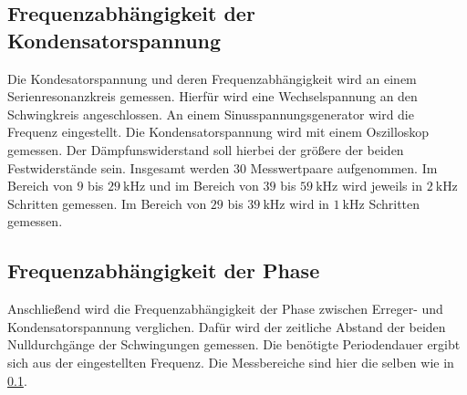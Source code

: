 \subsection{Frequenzabhängigkeit der Kondensatorspannung}
\label{sec:c}
Die Kondesatorspannung und deren Frequenzabhängigkeit wird an einem Serienresonanzkreis gemessen. Hierfür wird eine 
Wechselspannung an den Schwingkreis angeschlossen. An einem Sinusspannungsgenerator wird die Frequenz eingestellt.
Die Kondensatorspannung wird mit einem Oszilloskop gemessen. Der Dämpfunswiderstand soll hierbei der 
größere der beiden Festwiderstände sein. %
Insgesamt werden 30 Messwertpaare aufgenommen. Im Bereich von $\num{9}$ bis $\SI{29}{\kilo\hertz}$ und
im Bereich von $\num{39}$ bis $\SI{59}{\kilo\hertz}$ wird jeweils in $\SI{2}{\kilo\hertz}$ Schritten
gemessen. Im Bereich von $\num{29}$ bis $\SI{39}{\kilo\hertz}$ wird in $\SI{1}{\kilo\hertz}$ Schritten
gemessen.

\subsection{Frequenzabhängigkeit der Phase}
Anschließend wird die Frequenzabhängigkeit der Phase zwischen Erreger- und Kondensatorspannung verglichen. Dafür 
wird der zeitliche Abstand der beiden Nulldurchgänge der Schwingungen gemessen. Die benötigte Periodendauer ergibt sich aus der eingestellten
Frequenz. Die Messbereiche sind hier die selben wie in \ref{sec:c}.
